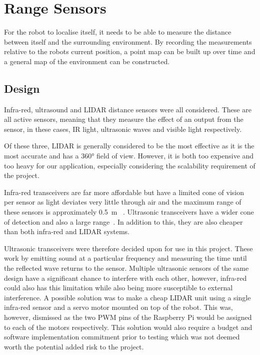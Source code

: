 \section{Range Sensors}\label{elec/range}
For the robot to localise itself, it needs to be able to measure the
distance between itself and the surrounding environment. By recording
the measurements relative to the robots current position, a point map
can be built up over time and a general map of the environment can be
constructed.

\subsection{Design}\label{elec/range/design}
Infra-red, ultrasound and LIDAR distance sensors were all considered. These
are all active sensors, meaning that they measure the effect of an
output from the sensor, in these cases, IR light, ultrasonic waves
and visible light respectively.

Of these three, LIDAR is generally considered to be the most effective
as it is the most accurate and has a \ang{360} field of view. However,
it is both too expensive and too heavy for our application, especially
considering the scalability requirement of the project. 

Infra-red transceivers are far more affordable but have a limited cone of 
vision per sensor as light deviates very little through air and the 
maximum range of these sensors is approximately \SI{0.5}{\m}~
\cite{InfraredDatasheet}. Ultrasonic transceivers have a wider cone of 
detection and also a large range~\cite{HCSR04datasheet}. In addition to 
this, they are also cheaper than both infra-red and LIDAR systems. 

Ultrasonic transceivers were therefore decided upon for use in this
project. These work by emitting sound at a particular frequency
and measuring the time until the reflected wave returns to the sensor. 
Multiple ultrasonic sensors of the same design have a significant chance to interfere with each other, 
however, infra-red could also has this limitation 
while also being more susceptible to external interference. A possible solution 
was to make a cheap LIDAR unit using a single infra-red sensor and a 
servo motor mounted on top of the robot. This was, however, dismissed as 
the two PWM pins of the Raspberry Pi would be assigned to each of the 
motors respectively. This solution would also require a budget and 
software implementation commitment prior to testing which was not deemed 
worth the potential added risk to the project.   

